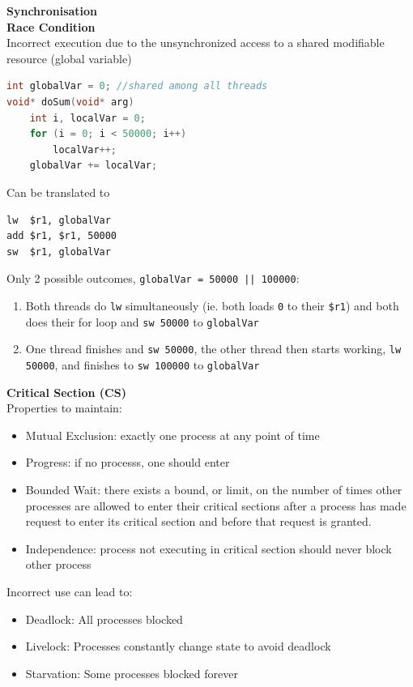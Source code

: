 \documentclass[a4paper, 12pt]{article}
\begin{document}
\begin{multicols*}{3}
\medskip

{\small\textbf{Synchronisation}} \\
\textbf{Race Condition} \\
Incorrect execution due to the unsynchronized access to a shared modifiable resource (global variable)
\begin{lstlisting}[language=C]
int globalVar = 0; //shared among all threads 
void* doSum(void* arg)
    int i, localVar = 0;
    for (i = 0; i < 50000; i++)
        localVar++;     
    globalVar += localVar;
\end{lstlisting}
Can be translated to
\begin{lstlisting}
lw  $r1, globalVar
add $r1, $r1, 50000 
sw  $r1, globalVar
\end{lstlisting}
Only 2 possible outcomes, \texttt{globalVar = 50000 || 100000}:
\begin{enumerate}
	\item Both threads do \texttt{lw} simultaneously (ie. both loads \texttt{0} to their \texttt{\$r1}) and both does their for loop and \texttt{sw 50000} to \texttt{globalVar}
	\item One thread finishes and \texttt{sw 50000}, the other thread then starts working, \texttt{lw 50000}, and finishes to \texttt{sw 100000} to \texttt{globalVar}
\end{enumerate}
\textbf{Critical Section (CS)} \\
Properties to maintain:
\begin{itemize}
	\item Mutual Exclusion: exactly one process at any point of time
	\item Progress: if no processs, one should enter
	\item Bounded Wait: there exists a bound, or limit, on the number of times other processes are allowed to enter their critical sections after a process has made request to enter its critical section and before that request is granted.
	\item Independence: process not executing in critical section should never block other process
\end{itemize}
Incorrect use can lead to: 
\begin{itemize}
    \item Deadlock: All processes blocked
    \item Livelock: Processes constantly change state to avoid deadlock
    \item Starvation: Some processes blocked forever
\end{itemize}

\end{multicols*}
\end{document}
